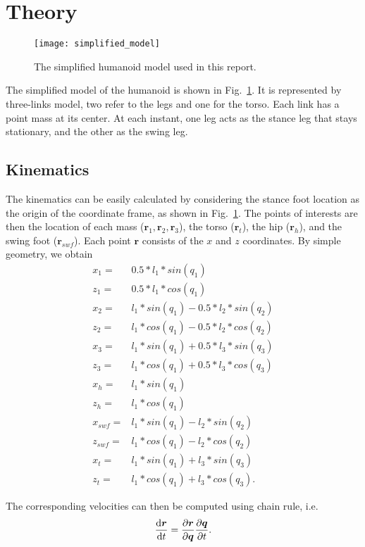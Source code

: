 \section{Theory}
\label{sec:theory}

\begin{figure}[h!]
\centering
\texttt{[image: simplified\_model]}
\caption{The simplified humanoid model used in this report.}
\label{fig:simplified_model}
\end{figure}

The simplified model of the humanoid is shown in Fig.~\ref{fig:simplified_model}. It is represented by three-links model, two refer to the legs and one for the torso. Each link has a point mass at its center. At each instant, one leg acts as the stance leg that stays stationary, and the other as the swing leg. 

\subsection{Kinematics}
\label{sec:kine}
The kinematics can be easily calculated by considering the stance foot location as the origin of the coordinate frame, as shown in Fig.~\ref{fig:simplified_model}. The points of interests are then the location of each mass ($\bm{r}_1, \bm{r}_2, \bm{r}_3$), the torso ($\bm{r}_t$), the hip ($\bm{r}_h$), and the swing foot ($\bm{r}_{swf}$). Each point $\bm{r}$ consists of the $x$ and $z$ coordinates. By simple geometry, we obtain
\begin{align}
x_1 = &  0.5*l_1*sin(q_1) \\
z_1 = & 0.5*l_1*cos(q_1) \\
x_2 = & l_1*sin(q_1)-0.5*l_2*sin(q_2) \\
z_2 = & l_1*cos(q_1)-0.5*l_2*cos(q_2) \\
x_3 = & l_1*sin(q_1)+ 0.5*l_3*sin(q_3) \\
z_3 = & l_1*cos(q_1)+ 0.5*l_3*cos(q_3) \\
x_h = & l_1*sin(q_1) \\
z_h = & l_1*cos(q_1) \\
x_{swf} = & l_1*sin(q_1)-l_2*sin(q_2) \\
z_{swf} = & l_1*cos(q_1)-l_2*cos(q_2) \\
x_t = & l_1*sin(q_1)+ l_3*sin(q_3) \\
z_t = & l_1*cos(q_1)+ l_3*cos(q_3).
\end{align}

The corresponding velocities can then be computed using chain rule, i.e.
\begin{equation}
\dv{\bm{r}}{t} = \pdv{\bm{r}}{\bm{q}} \pdv{\bm{q}}{t}.
\end{equation}

